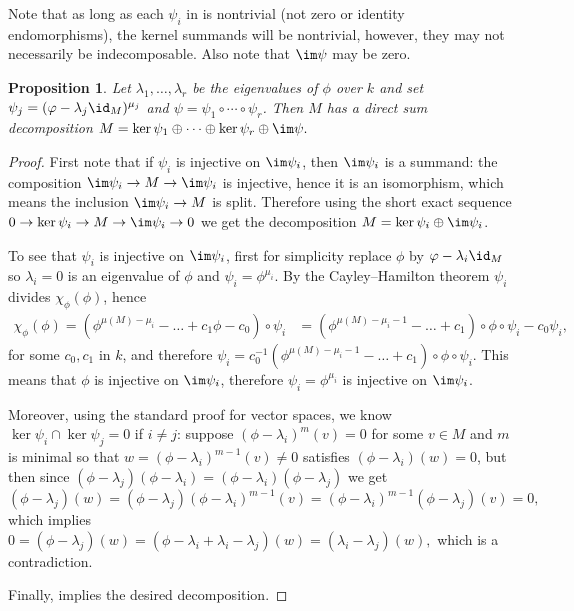 \documentclass[12pt]{article}
\theoremstyle{theorem}
\numberwithin{thm}{section}
\newtheorem{prop}[thm]{Proposition}
\theoremstyle{definition}
\begin{document}
Note that as long as each $\psi_i$ in  is nontrivial (not zero or identity endomorphisms), the kernel summands will be nontrivial, however, they may not necessarily be indecomposable. Also note that $\im\psi$ may be zero.

\begin{prop}\label{prop:split-surj}
  Let $\lambda_1,\dots,\lambda_r$ be the eigenvalues of $\phi$ over $k$ and set $\psi_j = (\phi - \lambda_j\id_M)^{\mu_j}$ and $\psi = \psi_1\circ\cdots\circ\psi_r$. Then $M$ has a direct sum decomposition
  \( M = \ker\psi_1 \oplus \cdots \oplus \ker\psi_r \oplus \im\psi. \)
\end{prop}
\begin{proof}
  First note that if $\psi_i$ is injective on $\im\psi_i$, then $\im\psi_i$ is a summand: the composition $\im\psi_i\to M\to \im\psi_i$ is injective, hence it is an isomorphism, which means the inclusion $\im\psi_i\to M$ is split. Therefore using the short exact sequence $0\to\ker\psi_i\to M\to\im\psi_i\to 0$ we get the decomposition $M = \ker\psi_i\oplus\im\psi_i$.

  To see that $\psi_i$ is injective on $\im\psi_i$, first for simplicity replace $\phi$ by $\phi-\lambda_i\id_M$ so $\lambda_i = 0$ is an eigenvalue of $\phi$ and $\psi_i = \phi^{\mu_i}$. By the Cayley--Hamilton theorem $\psi_i$ divides $\chi_\phi(\phi)$, hence
  \begin{align*}
    \chi_\phi(\phi) = \left(\phi^{\mu(M) - \mu_i} - \dots + c_1\phi - c_0\right) \circ \psi_i
    &= \left(\phi^{\mu(M) - \mu_i - 1} - \dots + c_1\right) \circ \phi \circ \psi_i - c_0 \psi_i,
  \end{align*}
  for some $c_0,c_1$ in $k$, and therefore
  \( \psi_i = c_0^{-1} \left(\phi^{\mu(M) - \mu_i - 1} - \dots + c_1\right) \circ \phi \circ \psi_i. \)
  This means that $\phi$ is injective on $\im\psi_i$, therefore $\psi_i=\phi^{\mu_i}$ is injective on $\im\psi_i$.

  Moreover, using the standard proof for vector spaces, we know $\ker\psi_i\cap\ker\psi_j = 0$ if $i\neq j$: suppose $(\phi - \lambda_i)^m(v) = 0$ for some $v\in M$ and $m$ is minimal so that $w = (\phi-\lambda_i)^{m-1}(v) \neq 0$ satisfies $(\phi-\lambda_i)(w) = 0$, but then since $(\phi - \lambda_j)(\phi - \lambda_i) = (\phi - \lambda_i)(\phi - \lambda_j)$ we get
  \[
  (\phi - \lambda_j)(w)
  = (\phi - \lambda_j)(\phi - \lambda_i)^{m-1}(v)
  =  (\phi - \lambda_i)^{m-1}(\phi - \lambda_j)(v) = 0,
  \]
  which implies
  \(
  0 = (\phi - \lambda_j)(w) = (\phi - \lambda_i + \lambda_i - \lambda_j)(w) = (\lambda_i - \lambda_j)(w),
  \)
  which is a contradiction.

  Finally,  implies the desired decomposition.
\end{proof}
\end{document}
